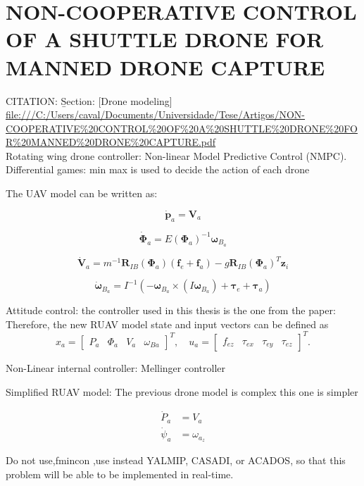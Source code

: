 \section{NON-COOPERATIVE CONTROL OF A SHUTTLE DRONE FOR MANNED DRONE CAPTURE}\label{NON-COOPERATIVE CONTROL OF A SHUTTLE DRONE FOR MANNED DRONE CAPTURE}
CITATION: \cite{10.1007/978-3-031-59167-9_7} \b{Section: [Drone modeling]}\\
\url{file:///C:/Users/caval/Documents/Universidade/Tese/Artigos/NON-COOPERATIVE%20CONTROL%20OF%20A%20SHUTTLE%20DRONE%20FOR%20MANNED%20DRONE%20CAPTURE.pdf}\\

Rotating wing drone controller: Non-linear Model Predictive Control (NMPC).\\
Differential games: min max is used to decide the action of each drone

The UAV model can be written as:

\[
\dot{\mathbf{p}}_a = \mathbf{V}_a
\]

\[
\dot{\mathbf{\Phi}}_a = E(\mathbf{\Phi}_a)^{-1} \boldsymbol{\omega}_{B_a}
\]

\[
\dot{\mathbf{V}}_a = m^{-1} \mathbf{R}_{IB}(\mathbf{\Phi}_a) \left( \mathbf{f}_e + \mathbf{f}_a \right) - g \mathbf{R}_{IB}(\mathbf{\Phi}_a)^T \mathbf{z}_i
\]

\[
\dot{\boldsymbol{\omega}}_{B_a} = I^{-1} \left( - \boldsymbol{\omega}_{B_a} \times (I \boldsymbol{\omega}_{B_a}) + \boldsymbol{\tau}_e + \boldsymbol{\tau}_a \right)
\]

Attitude control: the controller used in this thesis is the one from the paper: \cite{7535979}\\

Therefore, the new RUAV model state and input vectors can be defined as
\[
x_a = \begin{bmatrix}
P_a & \Phi_a & V_a & \omega_{Ba}
\end{bmatrix}^T,
\quad
u_a = \begin{bmatrix}
f_{ez} & \tau_{ex} & \tau_{ey} & \tau_{ez}
\end{bmatrix}^T .
\]

Non-Linear internal controller: Mellinger controller

Simplified RUAV model: The previous drone model is complex this one is simpler


\begin{align*}
    \dot{P}_a &= V_a \\
    \dot{\psi}_a &= \omega_{a_z}
\end{align*}

Do not use,fmincon ,use instead YALMIP, CASADI, or ACADOS, so that this problem will be able to be implemented in real-time.

